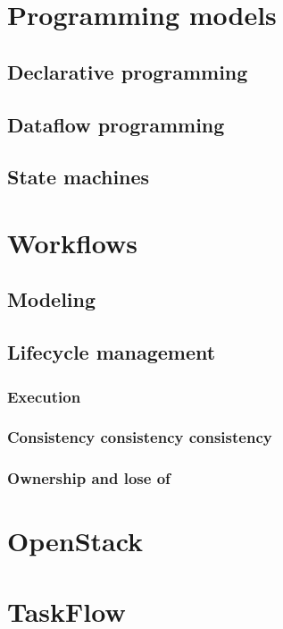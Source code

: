 \documentclass[11pt,a4paper]{article}
\begin{document}
\section{Programming models}

\subsection{Declarative programming}

\subsection{Dataflow programming}

\subsection{State machines}

\section{Workflows}

\subsection{Modeling}

\subsection{Lifecycle management}

\subsubsection{Execution}

\subsubsection{Consistency consistency consistency}

\subsubsection{Ownership and lose of}

\section{OpenStack}

\section{TaskFlow}
\end{document}
